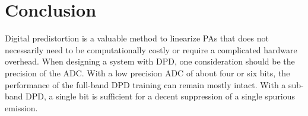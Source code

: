 \documentclass[conference]{IEEEtran}
\begin{document}
%






\section{Conclusion}
Digital predistortion is a valuable method to linearize PAs that does not necessarily need to be computationally costly or require a complicated hardware overhead. 
When designing a system with DPD, one consideration should be the precision of the ADC. 
With a low precision ADC of about four or six bits, the performance of the full-band DPD training can remain mostly intact.
With a sub-band DPD, a single bit is sufficient for a decent suppression of a single spurious emission. 
\end{document}
